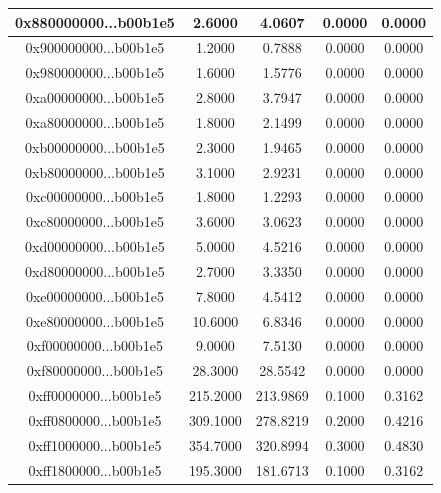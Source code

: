 \documentclass[12pt, a4paper]{article}
\begin{document}
\begin{table}[H]
\begin{tabular}{|c|c|c|c|c|}
0x880000000...b00b1e5 &         2.6000 &         4.0607 &         0.0000 &        0.0000 \\ \hline
0x900000000...b00b1e5 &         1.2000 &         0.7888 &         0.0000 &        0.0000 \\ \hline
0x980000000...b00b1e5 &         1.6000 &         1.5776 &         0.0000 &        0.0000 \\ \hline
0xa00000000...b00b1e5 &         2.8000 &         3.7947 &         0.0000 &        0.0000 \\ \hline
0xa80000000...b00b1e5 &         1.8000 &         2.1499 &         0.0000 &        0.0000 \\ \hline
0xb00000000...b00b1e5 &         2.3000 &         1.9465 &         0.0000 &        0.0000 \\ \hline
0xb80000000...b00b1e5 &         3.1000 &         2.9231 &         0.0000 &        0.0000 \\ \hline
0xc00000000...b00b1e5 &         1.8000 &         1.2293 &         0.0000 &        0.0000 \\ \hline
0xc80000000...b00b1e5 &         3.6000 &         3.0623 &         0.0000 &        0.0000 \\ \hline
0xd00000000...b00b1e5 &         5.0000 &         4.5216 &         0.0000 &        0.0000 \\ \hline
0xd80000000...b00b1e5 &         2.7000 &         3.3350 &         0.0000 &        0.0000 \\ \hline
0xe00000000...b00b1e5 &         7.8000 &         4.5412 &         0.0000 &        0.0000 \\ \hline
0xe80000000...b00b1e5 &        10.6000 &         6.8346 &         0.0000 &        0.0000 \\ \hline
0xf00000000...b00b1e5 &         9.0000 &         7.5130 &         0.0000 &        0.0000 \\ \hline
0xf80000000...b00b1e5 &        28.3000 &        28.5542 &         0.0000 &        0.0000 \\ \hline
0xff0000000...b00b1e5 &       215.2000 &       213.9869 &         0.1000 &        0.3162 \\ \hline
0xff0800000...b00b1e5 &       309.1000 &       278.8219 &         0.2000 &        0.4216 \\ \hline
0xff1000000...b00b1e5 &       354.7000 &       320.8994 &         0.3000 &        0.4830 \\ \hline
0xff1800000...b00b1e5 &       195.3000 &       181.6713 &         0.1000 &        0.3162 \\ \hline

\end{tabular}
\end{table}
\end{document}
